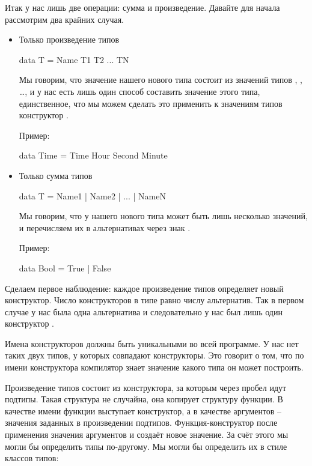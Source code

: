 Итак у нас лишь две операции: сумма и произведение. 
Давайте для начала рассмотрим два крайних случая.

\begin{itemize}
\item Только произведение типов

\begin{code}
data T = Name T1 T2 ... TN
\end{code}

Мы говорим, что значение нашего нового типа  состоит из
значений типов , , \dots ,  и у нас есть
лишь один способ составить значение этого типа, 
единственное, что мы можем сделать это применить к 
значениям типов  конструктор .

Пример:

\begin{code}
data Time = Time Hour Second Minute
\end{code}


\item Только сумма типов

\begin{code}
data T = Name1 | Name2 | ... | NameN
\end{code}

Мы говорим, что у нашего нового типа  может быть
лишь несколько значений, и перечисляем их в альтернативах
через знак \In{|}. 

Пример:

\begin{code}
data Bool = True | False
\end{code}


\end{itemize}

Сделаем первое наблюдение: каждое произведение типов 
определяет новый конструктор. Число конструкторов в типе 
равно числу альтернатив. Так в первом случае у нас была одна
альтернатива и следовательно у нас был лишь один конструктор
. 

Имена конструкторов должны быть уникальными во всей программе.
У нас нет таких двух типов, у которых совпадают конструкторы.
Это говорит о том, что по имени конструктора компилятор
знает значение какого типа он может построить. 

Произведение типов состоит из конструктора, за которым
через пробел идут подтипы. Такая структура не случайна,
она копирует структуру функции. В качестве имени функции
выступает конструктор, а в качестве аргументов -- значения
заданных в произведении подтипов. Функция-конструктор 
после применения  значения аргументов
и создаёт новое значение. За счёт этого мы могли бы 
определить типы по-другому. Мы могли бы определить их в стиле
классов типов:

